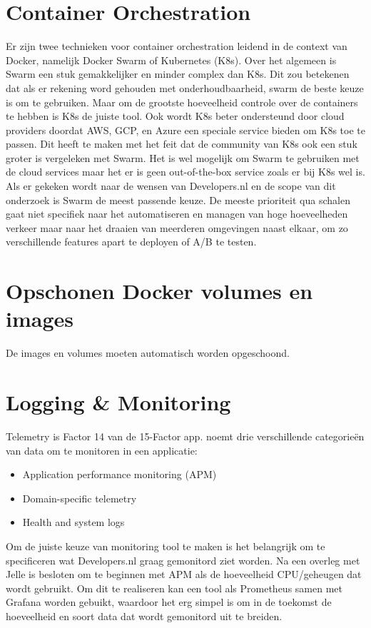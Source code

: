 \section{Container Orchestration}
Er zijn twee technieken voor container orchestration leidend in de context van Docker, namelijk Docker Swarm of Kubernetes (K8s). Over het algemeen is Swarm een stuk gemakkelijker en minder complex dan K8s. Dit zou betekenen dat als er rekening word gehouden met onderhoudbaarheid, swarm de beste keuze is om te gebruiken. Maar om de grootste hoeveelheid controle over de containers te hebben is K8s de juiste tool. Ook wordt K8s beter ondersteund door cloud providers doordat AWS, GCP, en Azure een speciale service bieden om K8s toe te passen. Dit heeft te maken met het feit dat de community van K8s ook een stuk groter is vergeleken met Swarm. Het is wel mogelijk om Swarm te gebruiken met de cloud services maar het er is geen out-of-the-box service zoals er bij K8s wel is. Als er gekeken wordt naar de wensen van Developers.nl en de scope van dit onderzoek is Swarm de meest passende keuze. De meeste prioriteit qua schalen gaat niet specifiek naar het automatiseren en managen van hoge hoeveelheden verkeer maar naar het draaien van meerderen omgevingen naast elkaar, om zo verschillende features apart te deployen of A/B te testen.

\section{Opschonen Docker volumes en images}
De images en volumes moeten automatisch worden opgeschoond.

\section{Logging \& Monitoring}
Telemetry is Factor 14 van de 15-Factor app. \parencite{Beyond12Factor} noemt drie verschillende categorieën van data om te monitoren in een applicatie:
\begin{itemize}
	\item Application performance monitoring (APM)
	\item Domain-specific telemetry
	\item Health and system logs
\end{itemize}

Om de juiste keuze van monitoring tool te maken is het belangrijk om te specificeren wat Developers.nl graag gemonitord ziet worden. Na een overleg met Jelle is besloten om te beginnen met APM als de hoeveelheid CPU/geheugen dat wordt gebruikt. Om dit te realiseren kan een tool als Prometheus samen met Grafana worden gebuikt, waardoor het erg simpel is om in de toekomst de hoeveelheid en soort data dat wordt gemonitord uit te breiden.

